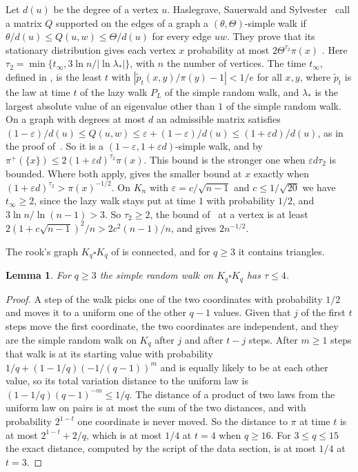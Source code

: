 \documentclass[11pt]{article}
\newtheorem{lemma}[theorem]{Lemma}
\theoremstyle{remark}
\theoremstyle{plain}
\begin{document}
Let $d(u)$ be the degree of a vertex $u$. Haslegrave, Sauerwald and Sylvester~\cite[Section~4.3]{HSS} call a matrix $Q$
supported on the edges of a graph a $(\theta,\Theta)$-simple walk if $\theta/d(u)\le Q(u,w)\le\Theta/d(u)$ for every
edge $uw$. They prove that its stationary distribution gives each vertex $x$ probability at most
$2\Theta^{\tau_2}\pi(x)$ \cite[Proposition~4.8]{HSS}. Here $\tau_2=\min\{t_\infty,3\ln n/|\ln\lambda_*|\}$, with $n$ the
number of vertices. The time
$t_\infty$, defined in \cite[Section~2, equation~(2)]{HSS}, is the least $t$ with $|\tilde p_t(x,y)/\pi(y)-1|<1/e$ for all $x,y$, where $\tilde p_t$ is the law at time
$t$ of the lazy walk $P_L$ of the simple random walk, and $\lambda_*$ is the largest absolute value of an eigenvalue other than $1$ of the
simple random walk. On a graph with degrees at most $d$ an admissible matrix satisfies
$(1-\varepsilon)/d(u)\le Q(u,w)\le\varepsilon+(1-\varepsilon)/d(u)\le(1+\varepsilon d)/d(u)$, as in the proof
of~\cite[Proposition~4.7]{HSS}. So it is a $(1-\varepsilon,1+\varepsilon d)$-simple walk, and by 
$\pi^+(\{x\})\le2(1+\varepsilon d)^{\tau_2}\pi(x)$. This bound is the stronger one when $\varepsilon d\tau_2$ is
bounded. Where both apply,  gives the smaller bound at $x$ exactly when
$(1+\varepsilon d)^{\tau_2}>\pi(x)^{-1/2}$. On $K_n$ with $\varepsilon=c/\sqrt{n-1}$ and $c\le1/\sqrt{20}$ we have
$t_\infty\ge2$, since the lazy walk stays put at time $1$ with probability $1/2$, and $3\ln n/\ln(n-1)>3$. So
$\tau_2\ge2$, the bound of~\cite{HSS} at a vertex is at least $2(1+c\sqrt{n-1})^2/n>2c^2(n-1)/n$, and 
gives $2n^{-1/2}$.

The rook's graph $K_q\square K_q$ of  is connected, and for $q\ge3$ it contains triangles.

\begin{lemma}\label{lem:rook}
For $q\ge3$ the simple random walk on $K_q\square K_q$ has $\tau\le4$.
\end{lemma}

\begin{proof}
A step of the walk picks one of the two coordinates with probability $1/2$ and moves it to a uniform one of the other
$q-1$ values. Given that $j$ of the first $t$ steps move the first coordinate, the two coordinates are independent, and
they are the simple random walk on $K_q$ after $j$ and after $t-j$ steps. After $m\ge1$ steps that walk is at its
starting value with probability $1/q+(1-1/q)(-1/(q-1))^m$ and is equally likely to be at each other value, so its
total variation distance to the uniform law is $(1-1/q)(q-1)^{-m}\le1/q$. The distance of a product of two laws from
the uniform law on pairs is at most the sum of the two distances, and with probability $2^{1-t}$ one coordinate is
never moved. So the distance to $\pi$ at time $t$ is at most $2^{1-t}+2/q$, which is at most $1/4$ at $t=4$ when
$q\ge16$. For $3\le q\le15$ the exact distance, computed by the script of the data section, is at most $1/4$ at
$t=3$.
\end{proof}
\end{document}
